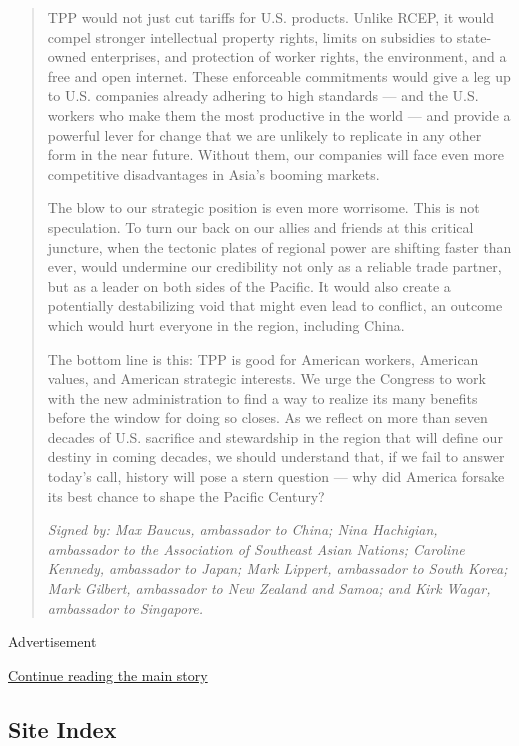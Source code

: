 \begin{quote}
TPP would not just cut tariffs for U.S. products. Unlike RCEP, it would
compel stronger intellectual property rights, limits on subsidies to
state-owned enterprises, and protection of worker rights, the
environment, and a free and open internet. These enforceable commitments
would give a leg up to U.S. companies already adhering to high standards
--- and the U.S. workers who make them the most productive in the world
--- and provide a powerful lever for change that we are unlikely to
replicate in any other form in the near future. Without them, our
companies will face even more competitive disadvantages in Asia's
booming markets.

The blow to our strategic position is even more worrisome. This is not
speculation. To turn our back on our allies and friends at this critical
juncture, when the tectonic plates of regional power are shifting faster
than ever, would undermine our credibility not only as a reliable trade
partner, but as a leader on both sides of the Pacific. It would also
create a potentially destabilizing void that might even lead to
conflict, an outcome which would hurt everyone in the region, including
China.

The bottom line is this: TPP is good for American workers, American
values, and American strategic interests. We urge the Congress to work
with the new administration to find a way to realize its many benefits
before the window for doing so closes. As we reflect on more than seven
decades of U.S. sacrifice and stewardship in the region that will define
our destiny in coming decades, we should understand that, if we fail to
answer today's call, history will pose a stern question --- why did
America forsake its best chance to shape the Pacific Century?

\emph{Signed by: Max Baucus, ambassador to China; Nina Hachigian,
ambassador to the Association of Southeast Asian Nations; Caroline
Kennedy, ambassador to Japan; Mark Lippert, ambassador to South Korea;
Mark Gilbert, ambassador to New Zealand and Samoa; and Kirk Wagar,
ambassador to Singapore.}
\end{quote}

Advertisement

\protect\hyperlink{after-bottom}{Continue reading the main story}

\hypertarget{site-index}{%
\subsection{Site Index}\label{site-index}}


